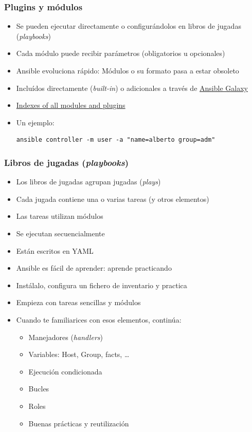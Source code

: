 \documentclass[aspectratio=169]{beamer}
\begin{document}
\begin{frame}[fragile]
  \frametitle{Plugins y módulos}
  \begin{itemize}
  \item Se pueden ejecutar directamente o configurándolos en libros de jugadas (\textit{playbooks})
  \item Cada módulo puede recibir parámetros (obligatorios u opcionales)
  \item Ansible evoluciona rápido: Módulos o su formato pasa a estar obsoleto
  \item Incluídos directamente (\textit{built-in}) o adicionales a través de \href{https://galaxy.ansible.com/}{Ansible Galaxy}
  \item \href{https://docs.ansible.com/ansible/latest/collections/all_plugins.html}{Indexes of all modules and plugins}
  \item Un ejemplo:
\begin{verbatim}
ansible controller -m user -a "name=alberto group=adm"
\end{verbatim}
  \end{itemize}
\end{frame}

\begin{frame}
  \frametitle{Libros de jugadas (\textit{playbooks})}
  \begin{itemize}
  \item Los libros de jugadas agrupan jugadas (\textit{plays})
  \item Cada jugada contiene una o varias tareas (y otros elementos)
  \item Las tareas utilizan módulos
  \item Se ejecutan secuencialmente
  \item Están escritos en YAML
  \end{itemize}
\end{frame}

\begin{frame}
  \begin{itemize}
  \item Ansible es fácil de aprender: aprende practicando
  \item Instálalo, configura un fichero de inventario y practica
  \item Empieza con tareas sencillas y módulos
  \item Cuando te familiarices con esos elementos, continúa:
    \begin{itemize}
    \item Manejadores (\textit{handlers})
    \item Variables: Host, Group, facts, \ldots
    \item Ejecución condicionada
    \item Bucles
    \item Roles
    \item Buenas prácticas y reutilización
    \end{itemize}
  \end{itemize}
\end{frame}
\end{document}
